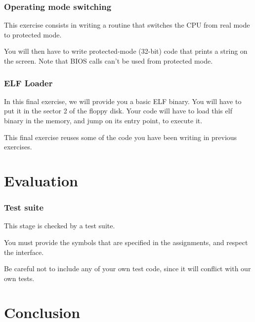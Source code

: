 
\begin{frame}
  \frametitle{Operating mode switching}

  This exercise consists in writing a routine that switches the CPU from real mode to protected mode.

  \-

  You will then have to write protected-mode (32-bit) code that prints a string on the screen. Note that BIOS calls can't be used from protected mode.

\end{frame}


\begin{frame}
  \frametitle{ELF Loader}

  In this final exercise, we will provide you a basic ELF binary. You will have to put it in the sector 2 of the floppy disk. Your code will have to load this elf binary in the memory, and jump on its entry point, to execute it.

  \-

  This final exercise reuses some of the code you have been writing in previous exercises.

\end{frame}

%
%

\section{Evaluation}


\begin{frame}
  \frametitle{Test suite}

  This stage is checked by a test suite.

  \-

  You must provide the symbols that are specified in the assignments, and respect the interface.

  Be careful not to include any of your own test code, since it will conflict with our own tests.

\end{frame}

%
%

\section{Conclusion}


